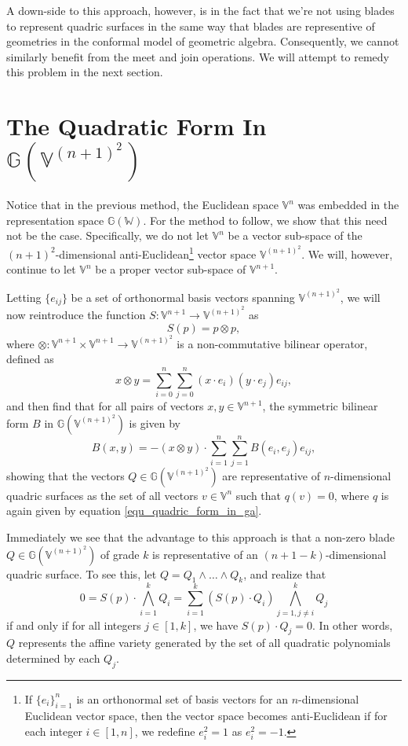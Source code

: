 \documentclass{birkjour}
\theoremstyle{definition}
\theoremstyle{remark}
\numberwithin{equation}{section}
\newcommand{\G}{\mathbb{G}}
\newcommand{\V}{\mathbb{V}}
\newcommand{\W}{\mathbb{W}}
\begin{document}
A down-side to this approach, however, is in the fact that we're not using blades
to represent quadric surfaces in the same way that blades are representive of geometries
in the conformal model of geometric algebra.  Consequently, we cannot similarly benefit
from the meet and join operations.
We will attempt to remedy this problem in the next section.

\section{The Quadratic Form In $\G(\V^{(n+1)^2})$}

Notice that in the previous method, the Euclidean space $\V^n$ was
embedded in the representation space $\G(\W)$.  For the method to
follow, we show that this need not be the case.  Specifically, we
do not let $\V^n$ be a vector sub-space of the $(n+1)^2$-dimensional
anti-Euclidean\footnote{If $\{e_i\}_{i=1}^n$ is an orthonormal set of basis
vectors for an $n$-dimensional Euclidean vector space, then the vector space
becomes anti-Euclidean if for each integer $i\in[1,n]$, we redefine $e_i^2=1$ as $e_i^2=-1$.}
vector space $\V^{(n+1)^2}$.
We will, however, continue to let $\V^n$ be a proper vector sub-space of $\V^{n+1}$.

Letting $\{e_{ij}\}$ be a set
of orthonormal basis vectors spanning $\V^{(n+1)^2}$, we will now reintroduce the
function $S:\V^{n+1}\to\V^{(n+1)^2}$ as
\begin{equation}
S(p) = p\otimes p,
\end{equation}
where $\otimes:\V^{n+1}\times\V^{n+1}\to\V^{(n+1)^2}$ is a non-commutative
bilinear operator, defined as
\begin{equation}
x\otimes y = \sum_{i=0}^n\sum_{j=0}^n(x\cdot e_i)(y\cdot e_j)e_{ij},
\end{equation}
and then find that for all pairs of vectors $x,y\in\V^{n+1}$, the symmetric
bilinear form $B$ in $\G(\V^{(n+1)^2})$ is given by
\begin{equation}
B(x,y) = -(x\otimes y)\cdot\sum_{i=1}^n\sum_{j=1}^n B(e_i,e_j)e_{ij},
\end{equation}
showing that the vectors $Q\in\G(\V^{(n+1)^2})$ are representative
of $n$-dimensional quadric surfaces as the set of all vectors $v\in\V^n$
such that $q(v)=0$, where $q$ is again given by equation \eqref{equ_quadric_form_in_ga}.

Immediately we see that the advantage to this approach is that a
non-zero blade $Q\in\G(\V^{(n+1)^2})$ of grade $k$ is representative
of an $(n+1-k)$-dimensional quadric surface.  To see this,
let $Q=Q_1\wedge\dots\wedge Q_k$, and realize that
\begin{equation}
0 = S(p)\cdot\bigwedge_{i=1}^k Q_i = \sum_{i=1}^k (S(p)\cdot Q_i)\bigwedge_{j=1,j\neq i}^k Q_j
\end{equation}
if and only if for all integers $j\in[1,k]$, we have $S(p)\cdot Q_j=0$.  In other words,
$Q$ represents the affine variety generated by the set of all quadratic polynomials
determined by each $Q_j$.
\end{document}
